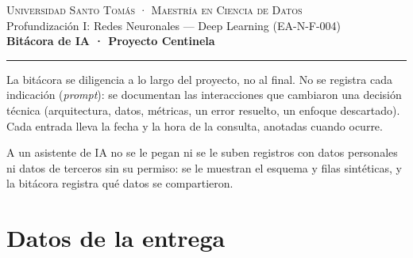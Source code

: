 \newenvironment{firmas}
  {\renewcommand{\arraystretch}{1.8}%
   \begin{longtable}{|p{0.36\linewidth}|p{0.34\linewidth}|p{0.19\linewidth}|}
   \hline
   \rowcolor{ustamorado!10}\textbf{Integrante} & \textbf{Firma} & \textbf{Fecha} \\ \hline
   \endhead}
  {\end{longtable}}
\newcommand{\firmante}[1]{#1 & & \pendiente{AAAA-MM-DD} \\ \hline}



\begin{center}
  {\small\color{ustamorado}\textsc{Universidad Santo Tomás · Maestría en Ciencia de Datos}}\\[2pt]
  {\small Profundización I: Redes Neuronales — Deep Learning (EA-N-F-004)}\\[12pt]
  {\LARGE\bfseries\color{ustanavy} Bitácora de IA · Proyecto Centinela}\\[6pt]
  {\color{ustarosa}\rule{0.45\linewidth}{1.2pt}}
\end{center}

La bitácora se diligencia a lo largo del proyecto, no al final. No se registra cada indicación (\textit{prompt}): se documentan las interacciones que cambiaron una decisión técnica (arquitectura, datos, métricas, un error resuelto, un enfoque descartado). Cada entrada lleva la fecha y la hora de la consulta, anotadas cuando ocurre.

A un asistente de IA no se le pegan ni se le suben registros con datos personales ni datos de terceros sin su permiso: se le muestran el esquema y filas sintéticas, y la bitácora registra qué datos se compartieron.

\section{Datos de la entrega}

\begin{ficha}
\end{ficha}


